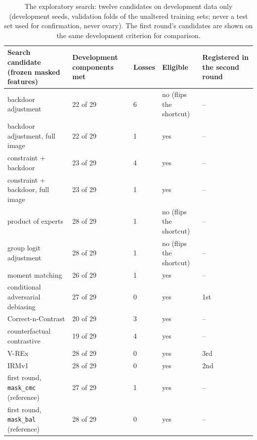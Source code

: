 \begin{table}[H]\centering\scriptsize
\caption{The exploratory search: twelve candidates on development data only (development seeds, validation folds of the unaltered training sets; never a test set used for confirmation, never ovary). The first round's candidates are shown on the same development criterion for comparison.}\label{tab:s17search}
\begin{tabular}{p{5.4cm}p{2.4cm}p{1.0cm}p{2.8cm}p{2.2cm}}\toprule
Search candidate (frozen masked features) & Development components met & Losses & Eligible & Registered in the second round \\\midrule
backdoor adjustment & 22 of 29 & 6 & no (flips the shortcut) & -- \\
backdoor adjustment, full image & 22 of 29 & 1 & yes & -- \\
constraint + backdoor & 23 of 29 & 4 & yes & -- \\
constraint + backdoor, full image & 23 of 29 & 1 & yes & -- \\
product of experts & 28 of 29 & 1 & no (flips the shortcut) & -- \\
group logit adjustment & 28 of 29 & 1 & no (flips the shortcut) & -- \\
moment matching & 26 of 29 & 1 & yes & -- \\
conditional adversarial debiasing & 27 of 29 & 0 & yes & 1st \\
Correct-n-Contrast & 20 of 29 & 3 & yes & -- \\
counterfactual contrastive & 19 of 29 & 4 & yes & -- \\
V-REx & 28 of 29 & 0 & yes & 3rd \\
IRMv1 & 28 of 29 & 0 & yes & 2nd \\
first round, \texttt{mask\_cmc} (reference) & 27 of 29 & 1 & yes & -- \\
first round, \texttt{mask\_bal} (reference) & 28 of 29 & 0 & yes & -- \\
\bottomrule\end{tabular}
\end{table}
